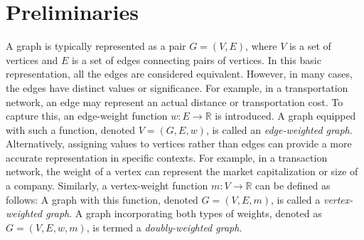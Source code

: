 \documentclass[preprint,12pt,number]{elsarticle}
\theoremstyle{plain} %
\theoremstyle{definition} %
\begin{document}
\section{Preliminaries}
A graph is typically represented as a pair $G=(V,E)$, where $V$ is a set of vertices and $E$ is a set of edges connecting pairs of vertices.
In this basic representation, all the edges are considered equivalent. However, in many cases, the edges have distinct values or significance. For example, in a transportation network, an edge may represent an actual distance or transportation cost. To capture this, an edge-weight function $w: E \to \mathbb{R}$ is introduced. A graph equipped with such a function, denoted $V=(G,E,w)$, is called an \textit{edge-weighted graph}. 
Alternatively, assigning values to vertices rather than edges can provide a more accurate representation in specific contexts. For example, in a transaction network, the weight of a vertex can represent the market capitalization or size of a company. Similarly, a vertex-weight function $m:V \to \mathbb{R}$ can be defined as follows: A graph with this function, denoted $G=(V,E,m)$, is called a \textit{vertex-weighted graph}. 
A graph incorporating both types of weights, denoted as $G=(V,E,w,m)$, is termed a \textit{doubly-weighted graph}.
\end{document}
